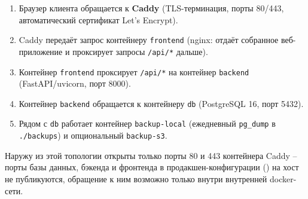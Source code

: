 \begin{enumerate}
  \item Браузер клиента обращается к \textbf{Caddy} (TLS-терминация,
        порты 80/443, автоматический сертификат Let's Encrypt).
  \item Caddy передаёт запрос контейнеру \texttt{frontend} (nginx:
        отдаёт собранное веб-приложение и проксирует запросы
        \texttt{/api/*} дальше).
  \item Контейнер \texttt{frontend} проксирует \texttt{/api/*} на
        контейнер \texttt{backend} (FastAPI/uvicorn, порт 8000).
  \item Контейнер \texttt{backend} обращается к контейнеру \texttt{db}
        (PostgreSQL 16, порт 5432).
  \item Рядом с \texttt{db} работает контейнер \texttt{backup-local}
        (ежедневный \texttt{pg\_dump} в \texttt{./backups}) и
        опциональный \texttt{backup-s3}.
\end{enumerate}

Наружу из этой топологии открыты только порты 80 и 443 контейнера Caddy --
порты базы данных, бэкенда и фронтенда в продакшен-конфигурации
() на хост не публикуются, обращение к ним
возможно только внутри внутренней docker-сети.



